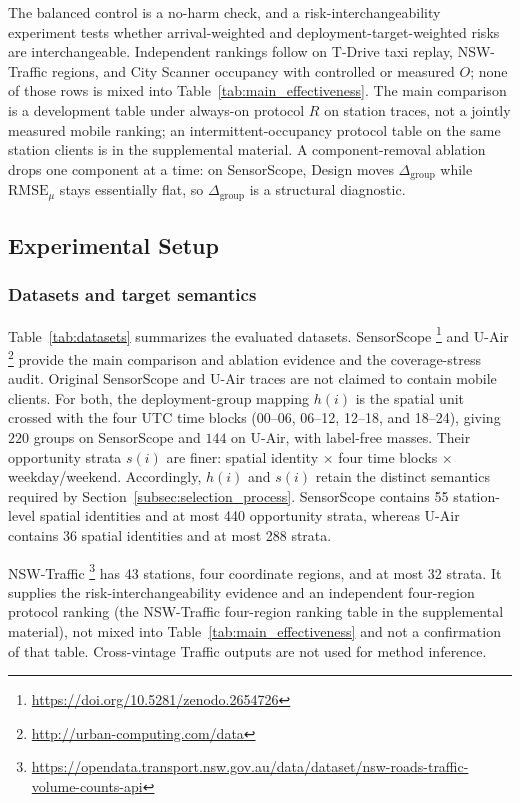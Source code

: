 \documentclass[letterpaper,journal]{IEEEtran}
\begin{document}
The balanced control is a no-harm check, and a risk-interchangeability
experiment tests whether arrival-weighted and deployment-target-weighted risks
are interchangeable.  Independent rankings follow on T-Drive taxi replay,
NSW-Traffic regions, and City Scanner occupancy with controlled or measured
$O$; none of those rows is mixed into
Table~\ref{tab:main_effectiveness}.  The main comparison is a development table
under always-on protocol $R$ on station traces, not a jointly measured mobile
ranking; an intermittent-occupancy protocol table on the same station clients
is in the supplemental material.  A component-removal ablation drops one
component at a time: on SensorScope, Design moves $\Delta_{\mathrm{group}}$
while $\mathrm{RMSE}_{\mu}$ stays essentially flat, so
$\Delta_{\mathrm{group}}$ is a structural diagnostic.

\subsection{Experimental Setup}
\label{subsec:eval_setup}

\subsubsection{Datasets and target semantics}

Table~\ref{tab:datasets} summarizes the evaluated datasets.  SensorScope
\cite{ingelrest2010sensorscope,barrenetxea2019sensorscope}\footnote{\url{https://doi.org/10.5281/zenodo.2654726}}
and U-Air
\cite{zheng2013uair}\footnote{\url{http://urban-computing.com/data}}
provide the main comparison and ablation evidence and the coverage-stress audit.
Original SensorScope and U-Air traces are not claimed to contain mobile
clients.  For both, the deployment-group mapping $h(i)$ is the spatial unit
crossed with the four UTC time blocks (00--06, 06--12, 12--18, and 18--24),
giving $220$ groups on SensorScope and $144$ on U-Air, with label-free
masses.  Their opportunity strata $s(i)$ are finer: spatial identity
$\times$ four time blocks $\times$ weekday/weekend.
Accordingly, $h(i)$ and $s(i)$ retain the distinct semantics required by
Section~\ref{subsec:selection_process}.  SensorScope contains 55 station-level
spatial identities and at most 440 opportunity strata, whereas U-Air contains
36 spatial identities and at most 288 strata.

NSW-Traffic
\cite{tfnsw2024traffic}\footnote{\url{https://opendata.transport.nsw.gov.au/data/dataset/nsw-roads-traffic-volume-counts-api}}
has 43 stations, four coordinate regions, and at most 32 strata.  It
supplies the risk-interchangeability evidence and an independent four-region protocol ranking
(the NSW-Traffic four-region ranking table in the supplemental material), not mixed into
Table~\ref{tab:main_effectiveness} and not a confirmation of that table.  Cross-vintage Traffic outputs are
not used for method inference.
\end{document}
